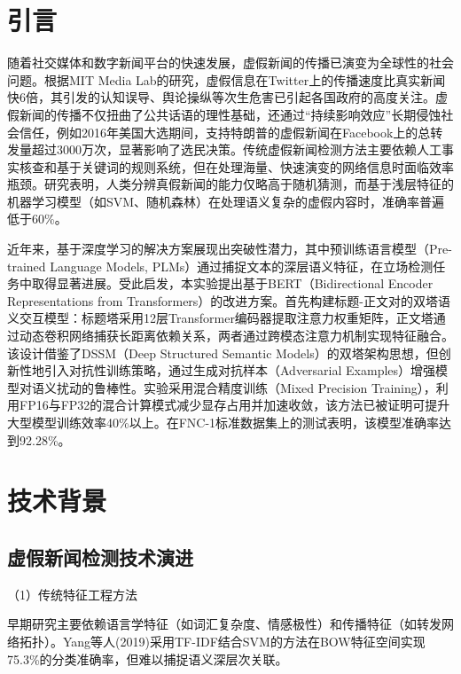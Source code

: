 \documentclass{cjc}
\begin{document}
\maketitle

\section{引言}

随着社交媒体和数字新闻平台的快速发展，虚假新闻的传播已演变为全球性的社会问题。根据MIT Media Lab的研究，虚假信息在Twitter上的传播速度比真实新闻快6倍\cite{doi:10.1126/science.aap9559}，其引发的认知误导、舆论操纵等次生危害已引起各国政府的高度关注。虚假新闻的传播不仅扭曲了公共话语的理性基础，还通过“持续影响效应”长期侵蚀社会信任，例如2016年美国大选期间，支持特朗普的虚假新闻在Facebook上的总转发量超过3000万次，显著影响了选民决策\cite{2016_US_Presidential_election}。传统虚假新闻检测方法主要依赖人工事实核查和基于关键词的规则系统，但在处理海量、快速演变的网络信息时面临效率瓶颈。研究表明，人类分辨真假新闻的能力仅略高于随机猜测，而基于浅层特征的机器学习模型（如SVM、随机森林）在处理语义复杂的虚假内容时，准确率普遍低于60\%。

近年来，基于深度学习的解决方案展现出突破性潜力，其中预训练语言模型（Pre-trained Language Models, PLMs）通过捕捉文本的深层语义特征，在立场检测任务中取得显著进展\cite{devlin-etal-2019-bert}。受此启发，本实验提出基于BERT（Bidirectional Encoder Representations from Transformers）的改进方案。首先构建标题-正文对的双塔语义交互模型：标题塔采用12层Transformer编码器提取注意力权重矩阵，正文塔通过动态卷积网络捕获长距离依赖关系，两者通过跨模态注意力机制实现特征融合。该设计借鉴了DSSM（Deep Structured Semantic Models）的双塔架构思想\cite{DSSM}，但创新性地引入对抗性训练策略，通过生成对抗样本（Adversarial Examples）增强模型对语义扰动的鲁棒性。实验采用混合精度训练（Mixed Precision Training），利用FP16与FP32的混合计算模式减少显存占用并加速收敛，该方法已被证明可提升大型模型训练效率40\%以上。在FNC-1标准数据集上的测试表明，该模型准确率达到92.28\%。

\section{技术背景}

\subsection{虚假新闻检测技术演进}

（1）传统特征工程方法

早期研究主要依赖语言学特征（如词汇复杂度、情感极性）和传播特征（如转发网络拓扑）。Yang等人(2019)采用TF-IDF结合SVM的方法在BOW特征空间实现75.3\%的分类准确率，但难以捕捉语义深层次关联。
\end{document}
